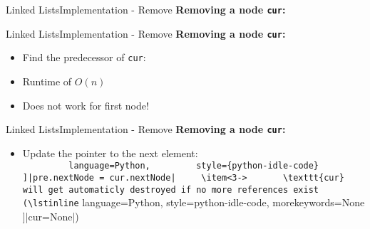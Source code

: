\begin{frame}{Linked Lists}{Implementation - Remove}
  \textbf{Removing a node \texttt{cur}:}
  \begin{flushleft}
    
  \end{flushleft}
\end{frame}


\begin{frame}{Linked Lists}{Implementation - Remove}
  \textbf{Removing a node \texttt{cur}:}
  \begin{itemize}
    \item<2->
      Find the predecessor of \texttt{cur}:\\
      
    \item<3->
      Runtime of $O(n)$
    \item<4->
      Does not work for first node!
  \end{itemize}
  \vspace{-1.5em}
  \begin{flushleft}
    
  \end{flushleft}
\end{frame}


\begin{frame}{Linked Lists}{Implementation - Remove}
  \textbf{Removing a node \texttt{cur}:}
  \begin{itemize}
    \item<2->
      Update the pointer to the next element:\\
      \lstinline[
        language=Python,
        style={python-idle-code}
      ]|pre.nextNode = cur.nextNode|
    \item<3->
      \texttt{cur} will get automaticly destroyed if no more references exist
      (\lstinline[
        language=Python,
        style={python-idle-code},
        morekeywords={None}
      ]|cur=None|)
  \end{itemize}
  \begin{flushleft}
    
  \end{flushleft}
\end{frame}

